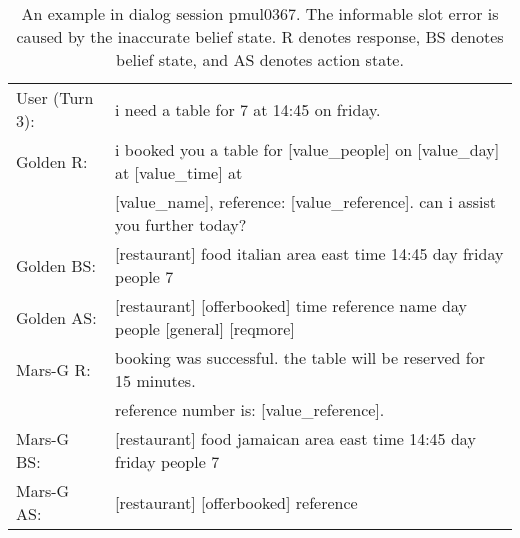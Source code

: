 \begin{table*}[ht]
{\begin{tabular}{ll}
  	 
  	 	\midrule
  	 	User (Turn 3):   &i need a table for 7 at 14:45 on friday.\\
  	 	  Golden R: & i booked you a table for [value\_people] on [value\_day] at [value\_time] at \\&[value\_name], reference: [value\_reference]. can i assist you further today?\\
  	 	 	Golden BS:  & [restaurant] {\color{red}food italian} area east time 14:45 day friday people 7 \\
  	 	 	Golden AS:&    [restaurant] [offerbooked] time reference name day people [general] [reqmore]    \\
  	 	     Mars-G R: & booking was successful. the table will be reserved for 15 minutes. \\&reference number is: [value\_reference].\\
  	 	 Mars-G BS:  & [restaurant] {\color{red}food jamaican} area east time 14:45 day friday people 7 \\
  Mars-G AS:&    [restaurant] [offerbooked] reference    \\
    
		\bottomrule
	\end{tabular}}\caption{An example in dialog session pmul0367. The informable slot error is caused by the inaccurate belief state. R denotes response, BS denotes belief state, and AS denotes action state. \label{tab:case1}}
\end{table*}

         

